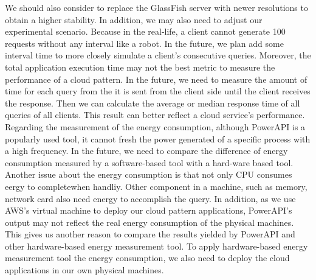 \documentclass{article}
\begin{document}
We should also consider to replace the GlassFish server with newer resolutions to obtain a higher stability. In addition, we may also need to adjust our experimental scenario. Because in the real-life, a client cannot generate 100 requests without any interval like a robot. In the future, we plan add some interval time to more closely simulate a client's consecutive queries. Moreover, the total application execution time may not the best metric to measure the performance of a cloud pattern. In the future, we need to measure the amount of time for each query from the it is sent from the client side until the client receives the response. Then we can calculate the average or median response time of all queries of all clients. This result can better reflect a cloud service's performance. \\

Regarding the measurement of the energy consumption, although PowerAPI is a popularly used tool, it cannot fresh the power generated of a specific process with a high frequency. In the future, we need to compare the difference of energy consumption measured by a software-based tool with a hard-ware based tool. Another issue about the energy consumption is that not only CPU consumes eergy to completewhen handliy. Other component in a machine, such as memory, network card also need energy to accomplish the query. In addition, as we use AWS's virtual machine to deploy our cloud pattern applications, PowerAPI's output may not reflect the real energy consumption of the physical machines. This gives us another reason to compare the results yielded by PowerAPI and other hardware-based energy measurement tool. To apply hardware-based energy measurement tool the energy consumption, we also need to deploy the cloud applications in our own physical machines. 



\end{document}
